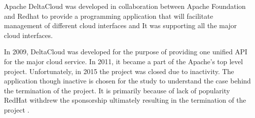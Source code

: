 Apache DeltaCloud was developed in collaboration between Apache Foundation and Redhat to provide a programming application that will 
facilitate management of different cloud interfaces and
It was supporting all the major cloud interfaces. 

In 2009, DeltaCloud was developed for the purpose of providing one unified API for the major cloud service. 
In 2011, it became a part of the Apache’s top level project. Unfortunately, in 2015 the project was closed due to inactivity. 
The application though inactive is chosen for the study to understand the case behind the termination of the project. 
It is primarily because of lack of popularity RedHat withdrew the sponsorship ultimately resulting in the 
termination of the project \cite{hid-sp18-417-wiki-deltacloud}.

